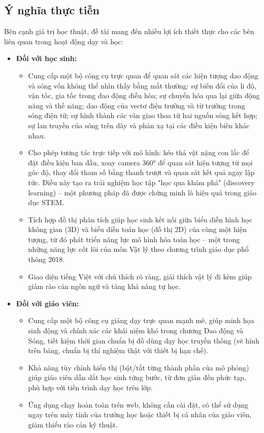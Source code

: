 \subsection{Ý nghĩa thực tiễn}
Bên cạnh giá trị học thuật, đề tài mang đến nhiều lợi ích thiết thực cho các bên liên quan trong hoạt động dạy và học:

\begin{itemize}
    \item \textbf{Đối với học sinh:}
    \begin{itemize}
        \item Cung cấp một bộ công cụ trực quan để quan sát các hiện tượng dao động và sóng vốn không thể nhìn thấy bằng mắt thường: sự biến đổi của li độ, vận tốc, gia tốc trong dao động điều hòa; sự chuyển hóa qua lại giữa động năng và thế năng; dao động của vectơ điện trường và từ trường trong sóng điện từ; sự hình thành các vân giao thoa từ hai nguồn sóng kết hợp; sự lan truyền của sóng trên dây và phản xạ tại các điều kiện biên khác nhau.
        \item Cho phép tương tác trực tiếp với mô hình: kéo thả vật nặng con lắc để đặt điều kiện ban đầu, xoay camera 360° để quan sát hiện tượng từ mọi góc độ, thay đổi tham số bằng thanh trượt và quan sát kết quả ngay lập tức. Điều này tạo ra trải nghiệm học tập "học qua khám phá" (discovery learning) – một phương pháp đã được chứng minh là hiệu quả trong giáo dục STEM.
        \item Tích hợp đồ thị phân tích giúp học sinh kết nối giữa biểu diễn hình học không gian (3D) và biểu diễn toán học (đồ thị 2D) của cùng một hiện tượng, từ đó phát triển năng lực mô hình hóa toán học – một trong những năng lực cốt lõi của môn Vật lý theo chương trình giáo dục phổ thông 2018.
        \item Giao diện tiếng Việt với chú thích rõ ràng, giải thích vật lý đi kèm giúp giảm rào cản ngôn ngữ và tăng khả năng tự học.
    \end{itemize}
    
    \item \textbf{Đối với giáo viên:}
    \begin{itemize}
        \item Cung cấp một bộ công cụ giảng dạy trực quan mạnh mẽ, giúp minh họa sinh động và chính xác các khái niệm khó trong chương Dao động và Sóng, tiết kiệm thời gian chuẩn bị đồ dùng dạy học truyền thống (vẽ hình trên bảng, chuẩn bị thí nghiệm thật với thiết bị hạn chế).
        \item Khả năng tùy chỉnh hiển thị (bật/tắt từng thành phần của mô phỏng) giúp giáo viên dẫn dắt học sinh từng bước, từ đơn giản đến phức tạp, phù hợp với tiến trình dạy học trên lớp.
        \item Ứng dụng chạy hoàn toàn trên web, không cần cài đặt, có thể sử dụng ngay trên máy tính của trường học hoặc thiết bị cá nhân của giáo viên, giảm thiểu rào cản kỹ thuật.
    \end{itemize}
    

\end{itemize}
